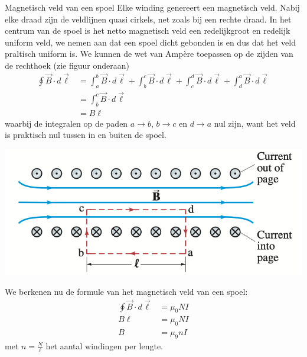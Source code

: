 \begin{theo}{Magnetisch veld van een spoel}
    \noindent Elke winding genereert een magnetisch veld. Nabij elke draad zijn de veldlijnen quasi cirkels, net zoals bij een rechte draad. 
    In het centrum van de spoel is het netto magnetisch veld een redelijkgroot en redelijk uniform veld, we nemen aan dat een spoel dicht gebonden is en dus dat het veld praltisch uniform is.
    We kunnen de wet van Ampère toepassen op de zijden van de rechthoek (zie figuur onderaan)
    \begin{align*}
        \oint \Vec{B} \cdot d\Vec{\ell} &= \int_{a}^{b} \Vec{B} \cdot d\Vec{\ell} + \int_{b}^{c} \Vec{B} \cdot d\Vec{\ell}
        +  \int_{c}^{d} \Vec{B} \cdot d\Vec{\ell} +  \int_{d}^{a} \Vec{B} \cdot d\Vec{\ell} \\
                                        &= \int_{b}^{c} \Vec{B} \cdot d\Vec{\ell}  \\
                                        &= B\ell
    \end{align*}
    waarbij de integralen op de paden $a \to b$, $b \to c$ en $d \to a$ nul zijn, want het veld is praktisch nul tussen in en buiten de spoel.
    \begin{center}
        \includegraphics[scale = 0.3]{Images/Magnetisme/SpoelMagnetischVeld}
    \end{center}
    We berkenen nu de formule van het magnetisch veld van een spoel:
    \begin{align*}
        \oint \Vec{B} \cdot d\Vec{\ell} &= \mu_{0}NI \\
        B\ell &=  \mu_{0}NI \\
        B &=  \mu_{9}nI
    \end{align*}
    met $n= \tfrac{N}{\ell}$ het aantal windingen per lengte.
\end{theo}

\newpage

